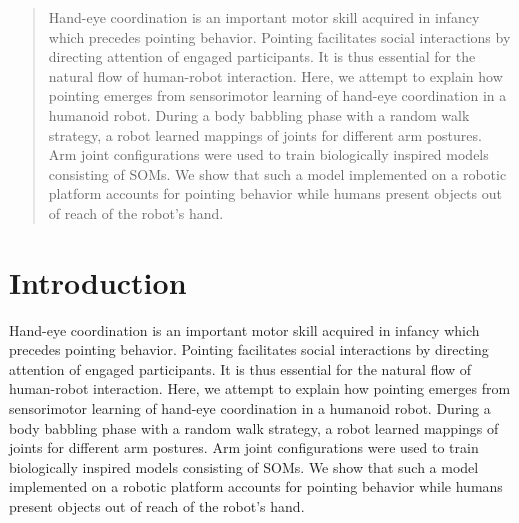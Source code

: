 \documentclass{sig-alternate-2013}
\begin{document}
\maketitle
\begin{abstract}
Hand-eye coordination is an important motor skill acquired in infancy which precedes pointing behavior. Pointing facilitates social interactions by directing attention of engaged participants. It is thus essential for the natural flow of human-robot interaction. Here, we attempt to explain how pointing emerges from sensorimotor learning of hand-eye coordination in a humanoid robot. During a body babbling phase with a random walk strategy, a robot learned mappings of joints for different arm postures. Arm joint configurations were used to train biologically inspired models consisting of SOMs. We show that such a model implemented on a robotic platform accounts for pointing behavior while humans present objects out of reach of the robot's hand.
\end{abstract}




\section{Introduction}
Hand-eye coordination is an important motor skill acquired in infancy which precedes pointing behavior. Pointing facilitates social interactions by directing attention of engaged participants. It is thus essential for the natural flow of human-robot interaction. Here, we attempt to explain how pointing emerges from sensorimotor learning of hand-eye coordination in a humanoid robot. During a body babbling phase with a random walk strategy, a robot learned mappings of joints for different arm postures. Arm joint configurations were used to train biologically inspired models consisting of SOMs. We show that such a model implemented on a robotic platform accounts for pointing behavior while humans present objects out of reach of the robot's hand.
\cite{Hafner2011}
\end{document}

